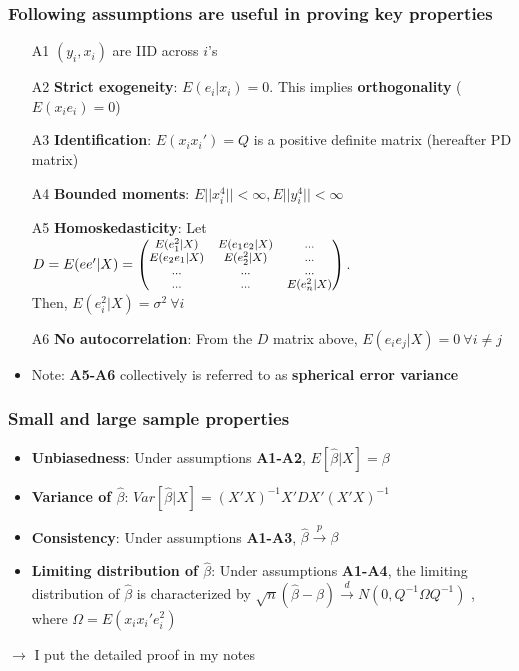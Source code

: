 \documentclass[aspectratio=169]{beamer}
\begin{document}
\begin{frame}
\frametitle{Following assumptions are useful in proving key properties}
\begin{itemize}
\item[A1] $(y_i, x_i)$ are IID across $i$'s
\item[A2] \textbf{Strict exogeneity}: $E(e_i|x_i)=0$. This implies \textbf{orthogonality} ($E(x_ie_i)=0$)
\item[A3] \textbf{Identification}: $E(x_ix_i')=Q$ is a positive definite matrix (hereafter PD matrix)
\item[A4] \textbf{Bounded moments}: $E||x_i^4||<\infty, E||y_i^4||<\infty$
\item[A5] \textbf{Homoskedasticity}: Let $D=E(ee'|X)=\footnotesize{\begin{pmatrix} E(e_1^2|X) & E(e_1e_2|X)& ...\\ E(e_2e_1|X) & E(e_2^2|X) & ...\\ ...&...&...\\ ...&...&E(e_n^2|X)  \end{pmatrix}}$. \\Then, $E(e_i^2|X)=\sigma^2\ \forall i$ 
\item[A6] \textbf{No autocorrelation}: From the $D$ matrix above, $E(e_ie_j|X)=0 \ \forall i\neq j$
\item Note: \textbf{A5-A6} collectively is referred to as \textbf{spherical error variance}
\end{itemize}
\end{frame}

\begin{frame}
\frametitle{Small and large sample properties}
\begin{itemize}
\item \textbf{Unbiasedness}: Under assumptions \textbf{A1-A2}, $E[\hat{\beta}|X]=\beta$
\item \textbf{Variance of $\hat{\beta}$}:  $Var[\hat{\beta}|X]=(X'X)^{-1}X'DX'(X'X)^{-1}$ 
\item \textbf{Consistency}: Under assumptions \textbf{A1-A3}, $\hat{\beta}\xrightarrow{p}\beta$
\item \textbf{Limiting distribution of $\hat{\beta}$}:  Under assumptions \textbf{A1-A4}, the limiting distribution of $\hat{\beta}$ is characterized by $\sqrt{n}(\hat{\beta}-\beta)\xrightarrow{d}N(0,Q^{-1}\Omega Q^{-1})$ , where $\Omega = E(x_ix_i'e_i^2)$
\end{itemize}
\medskip
$\to$ I put the detailed proof in my notes
\end{frame}
\end{document}

